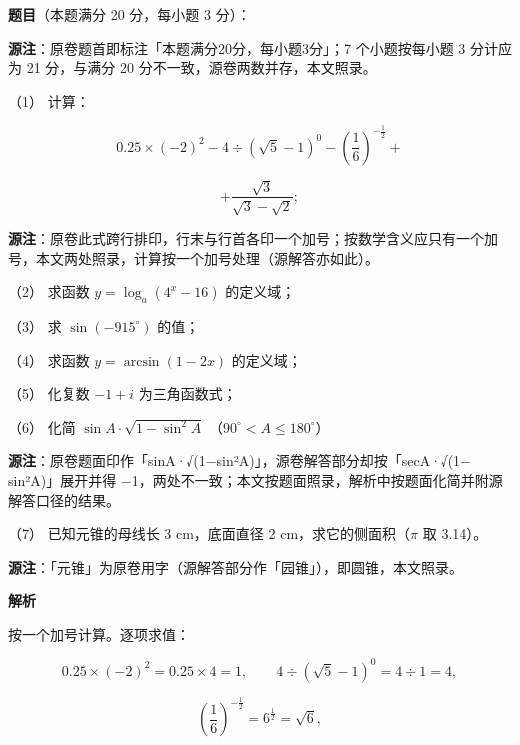 \begin{answer}

\textbf{题目}（本题满分 20 分，每小题 3 分）：

\begin{gktip}
\textbf{源注}：原卷题首即标注「本题满分20分，每小题3分」；7 个小题按每小题 3 分计应为 21 分，与满分 20 分不一致，源卷两数并存，本文照录。
\end{gktip}

（1） 计算：

\nopagebreak[4]
\[
0.25\times(-2)^2-4\div(\sqrt5-1)^0-\left(\frac16\right)^{-\frac12}+
\]

\nopagebreak[4]
\[
+\frac{\sqrt3}{\sqrt3-\sqrt2};
\]

\begin{gktip}
\textbf{源注}：原卷此式跨行排印，行末与行首各印一个加号；按数学含义应只有一个加号，本文两处照录，计算按一个加号处理（源解答亦如此）。
\end{gktip}

（2） 求函数 $y=\log_a(4^x-16)$ 的定义域；

（3） 求 $\sin(-915^\circ)$ 的值；

（4） 求函数 $y=\arcsin(1-2x)$ 的定义域；

（5） 化复数 $-1+i$ 为三角函数式；

（6） 化简 $\sin A\cdot\sqrt{1-\sin^2A}$ （$90^\circ<A\leqslant180^\circ$）

\begin{gktip}
\textbf{源注}：原卷题面印作「sinA·√(1$-$sin²A)」，源卷解答部分却按「secA·√(1$-$sin²A)」展开并得 $-$1，两处不一致；本文按题面照录，解析中按题面化简并附源解答口径的结果。
\end{gktip}

（7） 已知元锥的母线长 3 cm，底面直径 2 cm，求它的侧面积（$\pi$ 取 3.14）。

\begin{gktip}
\textbf{源注}：「元锥」为原卷用字（源解答部分作「园锥」），即圆锥，本文照录。
\end{gktip}

\textbf{解析}


按一个加号计算。逐项求值：

\nopagebreak[4]
\[
0.25\times(-2)^2=0.25\times4=1,
\qquad
4\div(\sqrt5-1)^0=4\div1=4,
\]

\nopagebreak[4]
\[
\left(\frac16\right)^{-\frac12}=6^{\frac12}=\sqrt6,
\]


\end{answer}

